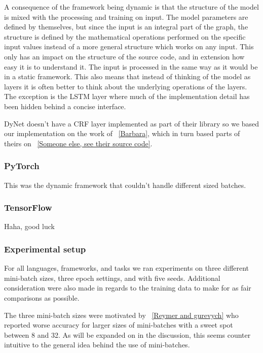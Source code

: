 A consequence of the framework being dynamic is that the structure of the model
is mixed with the processing and training on input. The model parameters are
defined by themselves, but since the input is an integral part of the graph, the
structure is defined by the mathematical operations performed on the specific
input values instead of a more general structure which works on any input. This
only has an impact on the structure of the source code, and in extension how
easy it is to understand it. The input is processed in the same way as it would
be in a static framework. This also means that instead of thinking of the model
as layers it is often better to think about the underlying operations of the
layers. The exception is the LSTM layer where much of the implementation detail
has been hidden behind a concise interface.

DyNet doesn't have a CRF layer implemented as part of their library so we based
our implementation on the work of ~\ref{Barbara}, which in turn based parts of
theirs on ~\ref{Someone else, see their source code}. 


\subsubsection*{PyTorch}

This was the dynamic framework that couldn't handle different sized batches.


\subsubsection*{TensorFlow}

Haha, good luck



\subsubsection{Experimental setup}

For all languages, frameworks, and tasks we ran experiments on three different
mini-batch sizes, three epoch settings, and with five seeds. Additional
consideration were also made in regards to the training data to make for as fair
comparisons as possible.

The three mini-batch sizes were motivated by ~\ref{Reymer and gurevych} who
reported worse accuracy for larger sizes of mini-batches with a sweet spot
between 8 and 32. As will be expanded on in the discussion, this seems counter
intuitive to the general idea behind the use of mini-batches. %

